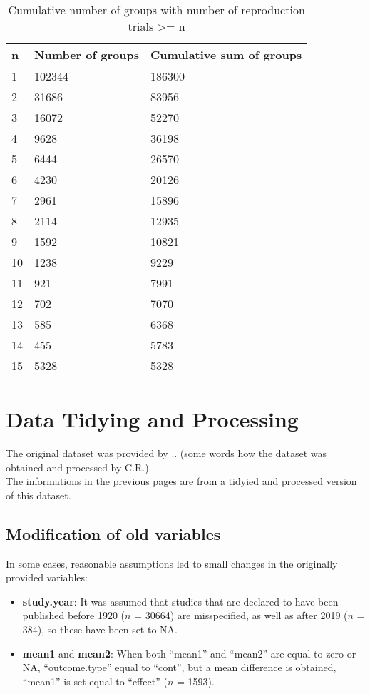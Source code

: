 \begin{table}[ht]
\centering
\begingroup\footnotesize
\begin{tabular}{lll}
  \hline
n & Number of groups & Cumulative sum of groups \\ 
  \hline
1 & 102344 & 186300 \\ 
  2 & 31686 & 83956 \\ 
  3 & 16072 & 52270 \\ 
  4 & 9628 & 36198 \\ 
  5 & 6444 & 26570 \\ 
  6 & 4230 & 20126 \\ 
  7 & 2961 & 15896 \\ 
  8 & 2114 & 12935 \\ 
  9 & 1592 & 10821 \\ 
  10 & 1238 & 9229 \\ 
  11 & 921 & 7991 \\ 
  12 & 702 & 7070 \\ 
  13 & 585 & 6368 \\ 
  14 & 455 & 5783 \\ 
  15 & 5328 & 5328 \\ 
   \hline
\end{tabular}
\endgroup
\caption{Cumulative number of groups with number of reproduction trials >= n} 
\label{repr.groups}
\end{table}


\section{Data Tidying and Processing}
The original dataset was provided by .. (some words how the dataset was obtained and processed by C.R.). \\
The informations in the previous pages are from a tidyied and processed version of this dataset. \\

\subsection{Modification of old variables}
In some cases, reasonable assumptions led to small changes in the originally provided variables:
\begin{itemize}
\item \textbf{study.year}: It was assumed that studies that are declared to have been published before 1920 ($n$ = 30664) are misspecified, as well as after 2019 ($n$ = 384), so these have been set to NA. 
\item \textbf{mean1} and \textbf{mean2}: When both ``mean1'' and ``mean2'' are equal to zero or NA, ``outcome.type'' equal to ``cont'', but a mean difference is obtained, ``mean1'' is set equal to ``effect'' ($n$ = 1593).
\end{itemize}



